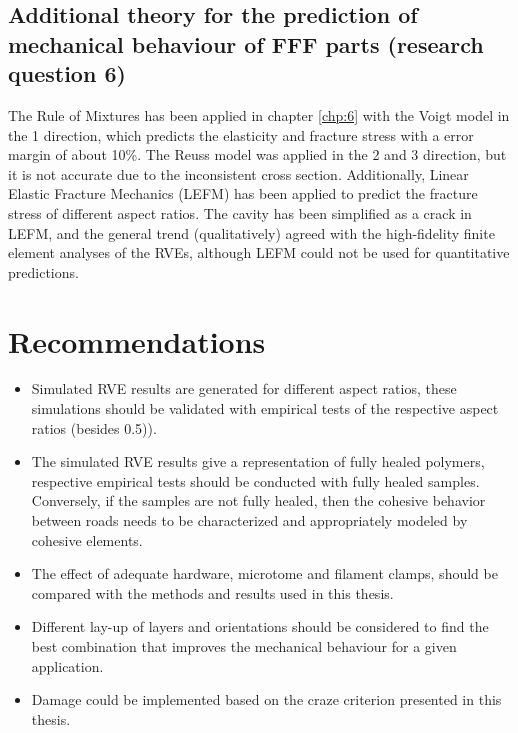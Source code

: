 \subsection{Additional theory for the prediction of mechanical behaviour of FFF parts (research question 6)}
The Rule of Mixtures has been applied in chapter \ref{chp:6} with the Voigt model in the 1 direction, which predicts the elasticity and fracture stress with a error margin of about 10\%. The Reuss model was applied in the 2 and 3 direction, but it is not accurate due to the inconsistent cross section.
Additionally, Linear Elastic Fracture Mechanics (LEFM) has been applied to predict the fracture stress of different aspect ratios. The cavity has been simplified as a crack in LEFM, and the general trend (qualitatively) agreed with the high-fidelity finite element analyses of the RVEs, although LEFM could not be used for quantitative predictions.

\section{Recommendations}
\begin{itemize}
  \item Simulated RVE results are generated for different aspect ratios, these simulations should be validated with empirical tests of the respective aspect ratios (besides 0.5)).

  \item The simulated RVE results give a representation of fully healed polymers, respective empirical tests should be conducted with fully healed samples. Conversely, if the samples are not fully healed, then the cohesive behavior between roads needs to be characterized and appropriately modeled by cohesive elements.
  
  
  \item The effect of adequate hardware, microtome and filament clamps, should be compared with the methods and results used in this thesis.
  
  
  \item Different lay-up of layers and orientations should be considered to find the best combination that improves the mechanical behaviour for a given application. 
  
  \item Damage could be implemented based on the craze criterion presented in this thesis. 
  

\end{itemize}

